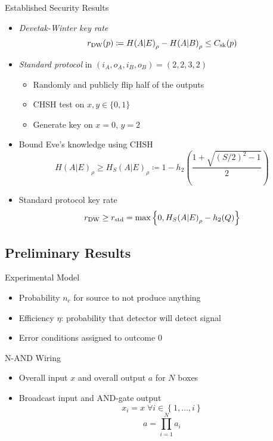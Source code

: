 \documentclass[xcolor=dvipsnames]{beamer}
\newcommand{\?}{\mathrel{?}} %
\newcommand{\dintv}[2]{\left\{#1,\ldots,#2\right\}}
\newcommand{\sk}{\rm sk}
\newcommand{\DW}{\rm DW}
\newcommand{\std}{\rm std}
\begin{document}
\begin{frame}{Established Security Results}
    \begin{itemize}[<+->]
    \item \emph{Devetak-Winter key rate}
      \[ r_{\DW}(p) \coloneqq {H(A|E)}_{\rho} - {H(A|B)}_{\rho} \leq C_{\sk}(p) \]
    \item \emph{Standard protocol} in \((i_A, o_A, i_B, o_B) = (2,2,3,2)\)
      \begin{itemize}
        \item Randomly and publicly flip half of the outputs
        \item CHSH test on \(x, y \in \{0,1\}\)
        \item Generate key on \(x=0\), \(y=2\)
      \end{itemize}
    \item Bound Eve's knowledge using CHSH
      \[ {H(A|E)}_{\rho} \geq {H_S(A|E)}_{\rho} \coloneqq 1 - h_2\left( \frac{1 + \sqrt{{(S/2)}^2-1}}{2} \right) \]
    \item Standard protocol key rate
      \[ r_{\DW} \geq r_{\std} = \max \left\{ 0, {H_S(A|E)}_{\rho} - h_2(Q) \right\} \]
    \end{itemize}
\end{frame}

\subsection{Preliminary Results}

\begin{frame}{Experimental Model}
  \begin{itemize}[<+->]
    \item Probability \(n_c\) for source to not produce anything
    \item Efficiency \(\eta\): probability that detector will detect signal
    \item Error conditions assigned to outcome \(0\)
  \end{itemize}
\end{frame}

\begin{frame}{N-AND Wiring}
  \begin{itemize}[<+->]
    \item Overall input \(x\) and overall output \(a\) for \(N\) boxes
    \item Broadcast input and AND-gate output
      \[ x_i = x\;\forall i \in \dintv{1}{i} \]
      \[ a = \prod_{i=1}^N a_i \]
  \end{itemize}
\end{frame}
\end{document}
